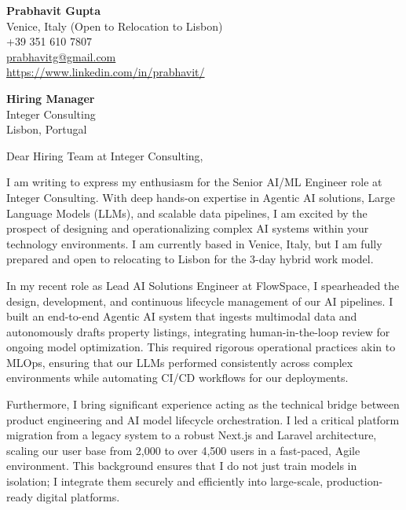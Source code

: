 \documentclass[a4paper,11pt]{article}
\begin{document}
\begin{flushleft}
\textbf{Prabhavit Gupta}\\
Venice, Italy (Open to Relocation to Lisbon)\\
+39 351 610 7807\\
\href{mailto:prabhavitg@gmail.com}{prabhavitg@gmail.com}\\
\href{https://www.linkedin.com/in/prabhavit/}{https://www.linkedin.com/in/prabhavit/}
\end{flushleft}

\vspace{2em}

\begin{flushleft}
\textbf{Hiring Manager}\\
Integer Consulting\\
Lisbon, Portugal
\end{flushleft}

\vspace{1em}

Dear Hiring Team at Integer Consulting,

I am writing to express my enthusiasm for the Senior AI/ML Engineer role at Integer Consulting. With deep hands-on expertise in Agentic AI solutions, Large Language Models (LLMs), and scalable data pipelines, I am excited by the prospect of designing and operationalizing complex AI systems within your technology environments. I am currently based in Venice, Italy, but I am fully prepared and open to relocating to Lisbon for the 3-day hybrid work model.

In my recent role as Lead AI Solutions Engineer at FlowSpace, I spearheaded the design, development, and continuous lifecycle management of our AI pipelines. I built an end-to-end Agentic AI system that ingests multimodal data and autonomously drafts property listings, integrating human-in-the-loop review for ongoing model optimization. This required rigorous operational practices akin to MLOps, ensuring that our LLMs performed consistently across complex environments while automating CI/CD workflows for our deployments. 

Furthermore, I bring significant experience acting as the technical bridge between product engineering and AI model lifecycle orchestration. I led a critical platform migration from a legacy system to a robust Next.js and Laravel architecture, scaling our user base from 2,000 to over 4,500 users in a fast-paced, Agile environment. This background ensures that I do not just train models in isolation; I integrate them securely and efficiently into large-scale, production-ready digital platforms.
\end{document}
